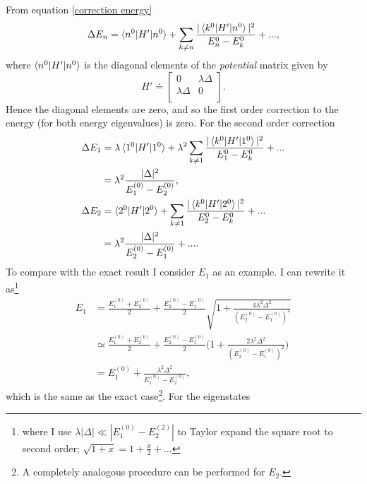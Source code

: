 \begin{example}
\begin{enumerate}
		From equation \eqref{correction energy}
		\begin{equation}
			\Delta E_n= \braket{n^0|H'|n^0}+\sum_{k\neq n}\frac{|\braket{k^0|H'|n^0}|^2}{E_n^0-E_k^0}+...,
		\end{equation} 
		where $\braket{n^0|H'|n^0}$ is the diagonal elements of the \emph{potential} matrix given by
		\begin{equation}
			H'\doteq\begin{bmatrix}
				0 & \lambda \Delta \\
				\lambda \Delta & 0\\
			\end{bmatrix}.
		\end{equation} 
		Hence the diagonal elements are zero, and so the first order correction to the energy (for both energy eigenvalues) is zero. For the second order correction
		\begin{equation}
			\begin{split}
				&\Delta E_1=\lambda \braket{1^0|H'|1^0}+\lambda^2\sum_{k\neq 1}\frac{|\braket{k^0|H'|1^0}|^2}{E_1^0-E_k^0}+...\\
				&\qquad=\lambda^2\frac{|\Delta|^2}{E_1^{(0)}-E_2^{(0)}},\\
				&\Delta E_2= \braket{2^0|H'|2^0}+\sum_{k\neq 1}\frac{|\braket{k^0|H'|2^0}|^2}{E_2^0-E_k^0}+...\\
				&\qquad=\lambda^2\frac{|\Delta|^2}{E_2^{(0)}-E_1^{(0)}}+....
			\end{split}
		\end{equation} 
		To compare with the exact result I consider $E_1$ as an example. I can rewrite it as\footnote{where I use $\lambda |\Delta|\ll |E_1^{(0)}-E_2^{(2)}|$ to Taylor expand the square root to second order; $\sqrt{1+x}=1+\frac{x}{2}+...$}
		\begin{equation}
			\begin{split}
				E_{1}&=\frac{E_1^{(0)}+E_2^{(0)}}{2}+\frac{E_2^{(0)}-E_1^{(0)}}{2}\sqrt{1+\frac{4\lambda^2\Delta^2}{(E_2^{(0)}-E_1^{(0)})^2}}\\
				&\simeq \frac{E_1^{(0)}+E_2^{(0)}}{2}+\frac{E_2^{(0)}-E_1^{(0)}}{2}\bigg(1+\frac{2\lambda^2\Delta^2}{(E_2^{(0)}-E_1^{(0)})^2}\bigg)\\
				&=E_1^{(0)}+\frac{\lambda^2\Delta^2}{E_1^{(0)}-E_2^{(0)}},
			\end{split}
		\end{equation} 
		which is the same as the exact case\footnote{A completely analogous procedure can be performed for $E_2$.}. For the eigenstates
		\begin{equation}

\end{equation}
\end{enumerate}
\end{example}
